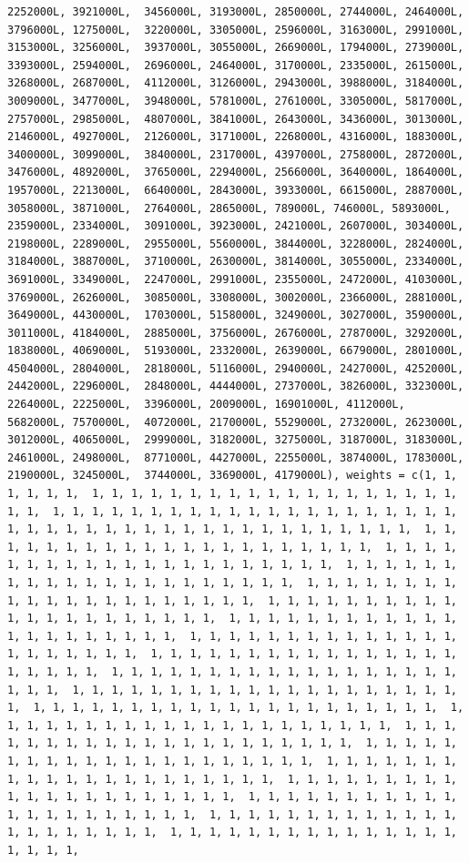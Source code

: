 \documentclass[
]{article}
\begin{document}
\begin{verbatim}
2252000L, 3921000L,  3456000L, 3193000L, 2850000L, 2744000L, 2464000L, 3796000L, 1275000L,  3220000L, 3305000L, 2596000L, 3163000L, 2991000L, 3153000L, 3256000L,  3937000L, 3055000L, 2669000L, 1794000L, 2739000L, 3393000L, 2594000L,  2696000L, 2464000L, 3170000L, 2335000L, 2615000L, 3268000L, 2687000L,  4112000L, 3126000L, 2943000L, 3988000L, 3184000L, 3009000L, 3477000L,  3948000L, 5781000L, 2761000L, 3305000L, 5817000L, 2757000L, 2985000L,  4807000L, 3841000L, 2643000L, 3436000L, 3013000L, 2146000L, 4927000L,  2126000L, 3171000L, 2268000L, 4316000L, 1883000L, 3400000L, 3099000L,  3840000L, 2317000L, 4397000L, 2758000L, 2872000L, 3476000L, 4892000L,  3765000L, 2294000L, 2566000L, 3640000L, 1864000L, 1957000L, 2213000L,  6640000L, 2843000L, 3933000L, 6615000L, 2887000L, 3058000L, 3871000L,  2764000L, 2865000L, 789000L, 746000L, 5893000L, 2359000L, 2334000L,  3091000L, 3923000L, 2421000L, 2607000L, 3034000L, 2198000L, 2289000L,  2955000L, 5560000L, 3844000L, 3228000L, 2824000L, 3184000L, 3887000L,  3710000L, 2630000L, 3814000L, 3055000L, 2334000L, 3691000L, 3349000L,  2247000L, 2991000L, 2355000L, 2472000L, 4103000L, 3769000L, 2626000L,  3085000L, 3308000L, 3002000L, 2366000L, 2881000L, 3649000L, 4430000L,  1703000L, 5158000L, 3249000L, 3027000L, 3590000L, 3011000L, 4184000L,  2885000L, 3756000L, 2676000L, 2787000L, 3292000L, 1838000L, 4069000L,  5193000L, 2332000L, 2639000L, 6679000L, 2801000L, 4504000L, 2804000L,  2818000L, 5116000L, 2940000L, 2427000L, 4252000L, 2442000L, 2296000L,  2848000L, 4444000L, 2737000L, 3826000L, 3323000L, 2264000L, 2225000L,  3396000L, 2009000L, 16901000L, 4112000L, 5682000L, 7570000L,  4072000L, 2170000L, 5529000L, 2732000L, 2623000L, 3012000L, 4065000L,  2999000L, 3182000L, 3275000L, 3187000L, 3183000L, 2461000L, 2498000L,  8771000L, 4427000L, 2255000L, 3874000L, 1783000L, 2190000L, 3245000L,  3744000L, 3369000L, 4179000L), weights = c(1, 1, 1, 1, 1, 1,  1, 1, 1, 1, 1, 1, 1, 1, 1, 1, 1, 1, 1, 1, 1, 1, 1, 1, 1, 1, 1,  1, 1, 1, 1, 1, 1, 1, 1, 1, 1, 1, 1, 1, 1, 1, 1, 1, 1, 1, 1, 1,  1, 1, 1, 1, 1, 1, 1, 1, 1, 1, 1, 1, 1, 1, 1, 1, 1, 1, 1, 1, 1,  1, 1, 1, 1, 1, 1, 1, 1, 1, 1, 1, 1, 1, 1, 1, 1, 1, 1, 1, 1, 1,  1, 1, 1, 1, 1, 1, 1, 1, 1, 1, 1, 1, 1, 1, 1, 1, 1, 1, 1, 1, 1,  1, 1, 1, 1, 1, 1, 1, 1, 1, 1, 1, 1, 1, 1, 1, 1, 1, 1, 1, 1, 1,  1, 1, 1, 1, 1, 1, 1, 1, 1, 1, 1, 1, 1, 1, 1, 1, 1, 1, 1, 1, 1,  1, 1, 1, 1, 1, 1, 1, 1, 1, 1, 1, 1, 1, 1, 1, 1, 1, 1, 1, 1, 1,  1, 1, 1, 1, 1, 1, 1, 1, 1, 1, 1, 1, 1, 1, 1, 1, 1, 1, 1, 1, 1,  1, 1, 1, 1, 1, 1, 1, 1, 1, 1, 1, 1, 1, 1, 1, 1, 1, 1, 1, 1, 1,  1, 1, 1, 1, 1, 1, 1, 1, 1, 1, 1, 1, 1, 1, 1, 1, 1, 1, 1, 1, 1,  1, 1, 1, 1, 1, 1, 1, 1, 1, 1, 1, 1, 1, 1, 1, 1, 1, 1, 1, 1, 1,  1, 1, 1, 1, 1, 1, 1, 1, 1, 1, 1, 1, 1, 1, 1, 1, 1, 1, 1, 1, 1,  1, 1, 1, 1, 1, 1, 1, 1, 1, 1, 1, 1, 1, 1, 1, 1, 1, 1, 1, 1, 1,  1, 1, 1, 1, 1, 1, 1, 1, 1, 1, 1, 1, 1, 1, 1, 1, 1, 1, 1, 1, 1,  1, 1, 1, 1, 1, 1, 1, 1, 1, 1, 1, 1, 1, 1, 1, 1, 1, 1, 1, 1, 1,  1, 1, 1, 1, 1, 1, 1, 1, 1, 1, 1, 1, 1, 1, 1, 1, 1, 1, 1, 1, 1,  1, 1, 1, 1, 1, 1, 1, 1, 1, 1, 1, 1, 1, 1, 1, 1, 1, 1, 1, 1, 1,  1, 1, 1, 1, 1, 1, 1, 1, 1, 1, 1, 1, 1, 1, 1, 1, 1, 1, 1, 1, 1,  1, 1, 1, 1, 1, 1, 1, 1, 1, 1, 1, 1, 1, 1, 1, 1, 1, 1, 1, 1, 1,  1, 1, 1, 1, 1, 1, 1, 1, 1, 1, 1, 1, 1, 1, 1, 1, 1, 1, 1, 1, 1,  1, 1, 1, 1, 1, 1, 1, 1, 1, 1, 1, 1, 1, 1, 1, 1, 1, 1, 1, 
\end{verbatim}
\end{document}
